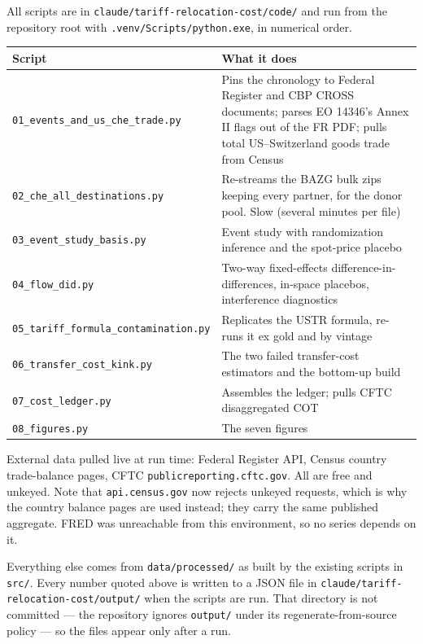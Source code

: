 \documentclass[11pt,a4paper]{article}
\begin{document}
All scripts are in \texttt{claude/tariff-relocation-cost/code/} and run from the repository root
with \texttt{.venv/Scripts/python.exe}, in numerical order.

\begin{center}
\small
\begin{tabular}{@{}lp{9.4cm}@{}}
\toprule
\textbf{Script} & \textbf{What it does} \\
\midrule
\texttt{01\_events\_and\_us\_che\_trade.py} & Pins the chronology to Federal Register and CBP CROSS documents; parses EO 14346's Annex II flags out of the FR PDF; pulls total US--Switzerland goods trade from Census \\
\texttt{02\_che\_all\_destinations.py} & Re-streams the BAZG bulk zips keeping every partner, for the donor pool. Slow (several minutes per file) \\
\texttt{03\_event\_study\_basis.py} & Event study with randomization inference and the spot-price placebo \\
\texttt{04\_flow\_did.py} & Two-way fixed-effects difference-in-differences, in-space placebos, interference diagnostics \\
\texttt{05\_tariff\_formula\_contamination.py} & Replicates the USTR formula, re-runs it ex gold and by vintage \\
\texttt{06\_transfer\_cost\_kink.py} & The two failed transfer-cost estimators and the bottom-up build \\
\texttt{07\_cost\_ledger.py} & Assembles the ledger; pulls CFTC disaggregated COT \\
\texttt{08\_figures.py} & The seven figures \\
\bottomrule
\end{tabular}
\end{center}

External data pulled live at run time: Federal Register API, Census country trade-balance pages,
CFTC \texttt{publicreporting.cftc.gov}. All are free and unkeyed. Note that
\texttt{api.census.gov} now rejects unkeyed requests, which is why the country balance pages are
used instead; they carry the same published aggregate. FRED was unreachable from this
environment, so no series depends on it.

Everything else comes from \texttt{data/processed/} as built by the existing scripts in
\texttt{src/}. Every number quoted above is written to a JSON file in
\texttt{claude/tariff-relocation-cost/output/} when the scripts are run. That directory is not
committed --- the repository ignores \texttt{output/} under its regenerate-from-source policy ---
so the files appear only after a run.
\end{document}
